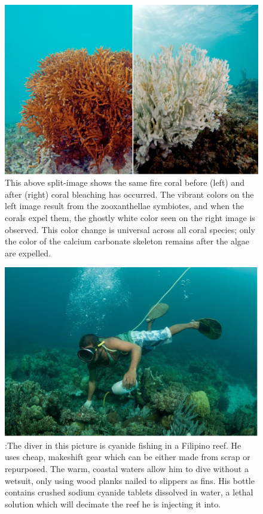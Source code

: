 \documentclass{book}\usepackage{knitr}
\begin{document}
\begin{knitrout}
\begin{kframe}
{\begin{figure}
\includegraphics[width=\linewidth]{images/coralbleach}
\caption{This above split-image shows the same fire coral before (left) and after (right) coral bleaching has occurred. The vibrant colors on the left image result from the zooxanthellae symbiotes, and when the corals expel them, the ghostly white color seen on the right image is observed. This color change is universal across all coral species; only the color of the calcium carbonate skeleton remains after the algae are expelled.}
\label{fig:Coral Bleaching}
\end{figure}

\begin{figure}
\includegraphics[width=\linewidth]{images/cyanidefishing}
\caption{:The diver in this picture is cyanide fishing in a Filipino reef. He uses cheap, makeshift gear which can be either made from scrap or repurposed. The warm, coastal waters allow him to dive without a wetsuit, only using wood planks nailed to slippers as fins. His bottle contains crushed sodium cyanide tablets dissolved in water, a lethal solution which will decimate the reef he is injecting it into.}
\label{fig:Cyanide Fishing}
\end{figure}

}
\end{kframe}
\end{knitrout}
\end{document}
